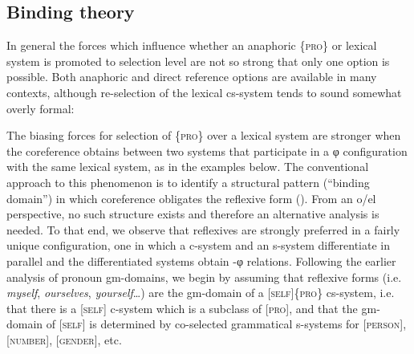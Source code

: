 \subsection{Binding theory}

In general the forces which influence whether an anaphoric \{\textsc{pro}\} or lexical system is promoted to selection level are not so strong that only one option is possible. Both anaphoric and direct reference options are available in many contexts, although re-selection of the lexical cs-system tends to sound somewhat overly formal:

\ea
\z
\z

  The biasing forces for selection of \{\textsc{pro}\} over a lexical system are stronger when the coreference obtains between two systems that participate in a φ configuration with the same lexical system, as in the examples below. The conventional approach to this phenomenon is to identify a structural pattern (“binding domain”) in which coreference obligates the reflexive form (\citealt{Chomsky1982,Chomsky1993,Haegeman1994,Reinhart1976,Safir2004}). From an o/el perspective, no such structure exists and therefore an alternative analysis is needed. To that end, we observe that reflexives are strongly preferred in a fairly unique configuration, one in which a c-system and an s-system differentiate in parallel and the differentiated systems obtain -φ relations. Following the earlier analysis of pronoun gm-domains, we begin by assuming that reflexive forms (i.e. \textit{myself}, \textit{ourselves}, \textit{yourself}…) are the gm-domain of a [\textsc{self}]\{\textsc{pro}\} cs-system, i.e. that there is a [\textsc{self}] c-system which is a subclass of [\textsc{pro}], and that the gm-domain of [\textsc{self}] is determined by co-selected grammatical s-systems for [\textsc{person}], [\textsc{number}], [\textsc{gender}], etc. 

\ea
{}      
\z
\z

